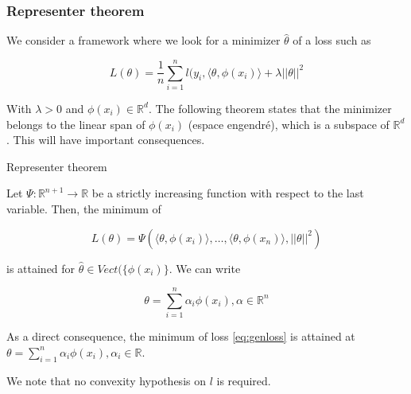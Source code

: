\documentclass[
10pt, %
a4paper, %
oneside, %
headinclude,footinclude, %
BCOR5mm, %
]{scrartcl}
\begin{document}
\subsubsection{\large\color{Periwinkle}Representer theorem}

We consider a framework where we look for a minimizer $ \hat{\theta}$ of a loss such as

\begin{equation}
    \label{eq:genloss}
    L( \theta) = \frac{1}{n} \sum^{n}_{i=1} l(y_i, \langle\theta,\phi(x_i)\rangle+\lambda ||\theta||^2
\end{equation}

With $\lambda>0$ and $\phi(x_i)\in \mathbb{R}^d$. The following theorem states that the minimizer belongs to the linear span of $\phi(x_i)$ (espace engendré), which is a subspace of $ \mathbb{R}^d$. This will have important consequences.

\begin{theorem}{Representer theorem}

    Let $\Psi : \mathbb{R}^{n+1}\rightarrow \mathbb{R} $ be a strictly increasing function with respect to the last variable. Then, the minimum of 

    \begin{equation*}
	L(\theta)  =\Psi(\langle\theta,\phi(x_i) \rangle, \dots, \langle\theta, \phi(x_n) \rangle, ||\theta||^2)
    \end{equation*}

    is attained for $ \hat{\theta}\in Vect(\{\phi(x_i)\}$. We can write
    
    \begin{equation*}
	\theta = \sum^{n}_{i=1} \alpha_i\phi(x_i), \alpha\in \mathbb{R}^n
    \end{equation*}
\end{theorem}

\begin{corollary}
    As a direct consequence, the minimum of loss \ref{eq:genloss} is attained at $\theta = \sum^{n}_{i=1} \alpha_i\phi(x_i), \alpha_i\in \mathbb{R}$.

    We note that no convexity hypothesis on $l$ is required.
\end{corollary}
\end{document}
